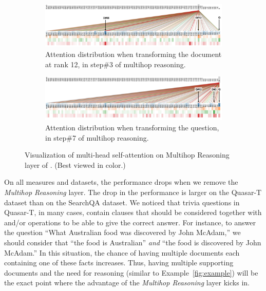\begin{figure}[!t]
    \centering
    \begin{subfigure}[t]{\textwidth}
        \centering
        \includegraphics[width=\textwidth]{04-part-03/chapter-06/figs_and_tables/fig_att_tracrnet_step3.png}
        \caption{\label{fig:attention_vis_a}Attention distribution %
        when transforming the document at rank 12, in step\#3 of multihop reasoning.}
    \end{subfigure}%
    \vfill
    \begin{subfigure}[t]{\textwidth}
        \centering
        \includegraphics[width=\textwidth]{04-part-03/chapter-06/figs_and_tables/fig_att_tracrnet_step7.png}
        \caption{\label{fig:attention_vis_b}Attention distribution %
        when transforming the question, in step\#7 of multihop reasoning.}
    \end{subfigure}
     \caption{Visualization  of multi-head self-attention on Multihop Reasoning layer of \tracrnet. 
     (Best viewed in color.)}
     \label{fig:attention_vis}
\end{figure}

On all measures and datasets, the performance drops when we remove the \emph{Multihop Reasoning} layer. 
The drop in the performance is larger on the Quasar-T dataset than on the SearchQA dataset.
We noticed that trivia questions in Quasar-T, in many cases, contain clauses that should be considered together with and/or operations to be able to give the correct answer. 
For instance, to answer the question ``What Australian food was discovered by John McAdam,'' we should consider that ``the food is Australian'' \emph{and} ``the food is discovered by John McAdam.'' 
In this situation, the chance of having multiple documents each containing one of these facts increases. 
Thus, having multiple supporting documents and the need for reasoning (similar to Example~\ref{fig:example}) will be the exact point where the advantage of the \emph{Multihop Reasoning} layer kicks in.

